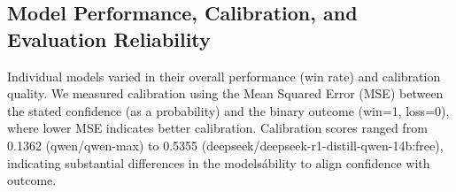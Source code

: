 \documentclass{article}
\begin{document}

\subsection{Model Performance, Calibration, and Evaluation Reliability}

Individual models varied in their overall performance (win rate) and calibration quality. We measured calibration using the Mean Squared Error (MSE) between the stated confidence (as a probability) and the binary outcome (win=1, loss=0), where lower MSE indicates better calibration. Calibration scores ranged from 0.1362 (qwen/qwen-max) to 0.5355 (deepseek/deepseek-r1-distill-qwen-14b:free), indicating substantial differences in the models\' ability to align confidence with outcome.
\end{document}
